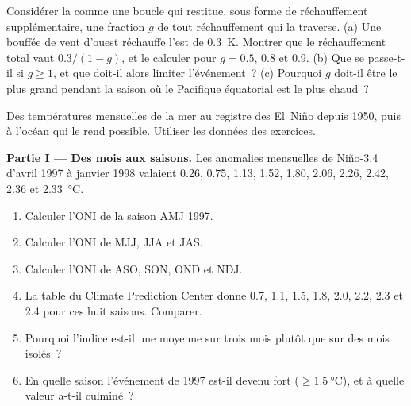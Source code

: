 \begin{exercise}[$\star\star\star$]\label{exo:b2:climate-variability:12}
Considérer la  comme une boucle qui restitue, sous forme de réchauffement supplémentaire,
une fraction $g$ de tout réchauffement qui la traverse. (a) Une bouffée de vent d'ouest réchauffe l'est de \qty{0.3}{K}.
Montrer que le réchauffement total vaut $0.3/(1 - g)$, et le calculer pour $g = 0.5$, 0.8 et 0.9. (b) Que se passe-t-il
si $g \geq 1$, et que doit-il alors limiter l'événement~? (c) Pourquoi $g$ doit-il être le plus grand
pendant la saison où le Pacifique équatorial est le plus chaud~?
\end{exercise}

\begin{problem}\label{pb:b2:climate-variability:1}
Des températures mensuelles de la mer au registre des El~Niño depuis 1950, puis à l'océan qui le rend possible.
Utiliser les données des exercices.

\medskip\noindent\textbf{Partie I --- Des mois aux saisons.}
Les anomalies mensuelles de Niño-3.4 d'avril 1997 à janvier 1998 valaient 0.26, 0.75, 1.13, 1.52, 1.80,
2.06, 2.26, 2.42, 2.36 et \qty{2.33}{\celsius}.
\begin{enumerate}
\item Calculer l'ONI de la saison AMJ 1997.
\item Calculer l'ONI de MJJ, JJA et JAS.
\item Calculer l'ONI de ASO, SON, OND et NDJ.
\item La table du Climate Prediction Center donne 0.7, 1.1, 1.5, 1.8, 2.0, 2.2, 2.3 et
      2.4 pour ces huit saisons. Comparer.
\item Pourquoi l'indice est-il une moyenne sur trois mois plutôt que sur des mois isolés~?
\item En quelle saison l'événement de 1997 est-il devenu fort ($\geq \qty{1.5}{\celsius}$), et à
      quelle valeur a-t-il culminé~?
\end{enumerate}


\end{problem}

